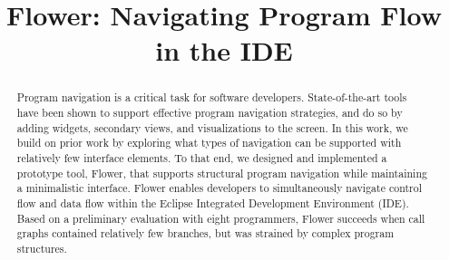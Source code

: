 \documentclass[conference]{IEEEtran}
\begin{document}
%
\title{Flower: Navigating Program Flow in the IDE}


\author{
	}


\maketitle

\begin{abstract}
Program navigation is a critical task for software developers. 
State-of-the-art tools have been shown to support effective program navigation strategies, and do so by adding widgets, secondary views, and visualizations to the screen. 
In this work, we build on prior work by exploring what types of navigation can be supported with relatively few interface elements.
To that end, we designed and implemented a prototype tool, Flower, that supports structural program navigation while maintaining a minimalistic interface.
Flower enables developers to simultaneously navigate control flow and data flow within the Eclipse Integrated Development Environment (IDE).
Based on a preliminary evaluation with eight programmers, Flower succeeds when call graphs contained relatively few branches, but was strained by complex program structures.
\end{abstract}
\end{document}
